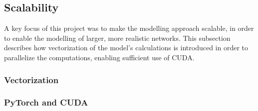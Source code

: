 
\subsection{Scalability}
\label{sec:Method:Scalability}
A key focus of this project was to make the modelling approach scalable, in order to enable the modelling of larger, more realistic networks.
This subsection describes how vectorization of the model's calculations is introduced in order to parallelize the computations, enabling sufficient use of CUDA.

\subsubsection{Vectorization}
\label{sec:Method:Scalability:Vectorization}


\subsubsection{PyTorch and CUDA}
\label{sec:Method:Scalability:PyTorch}




